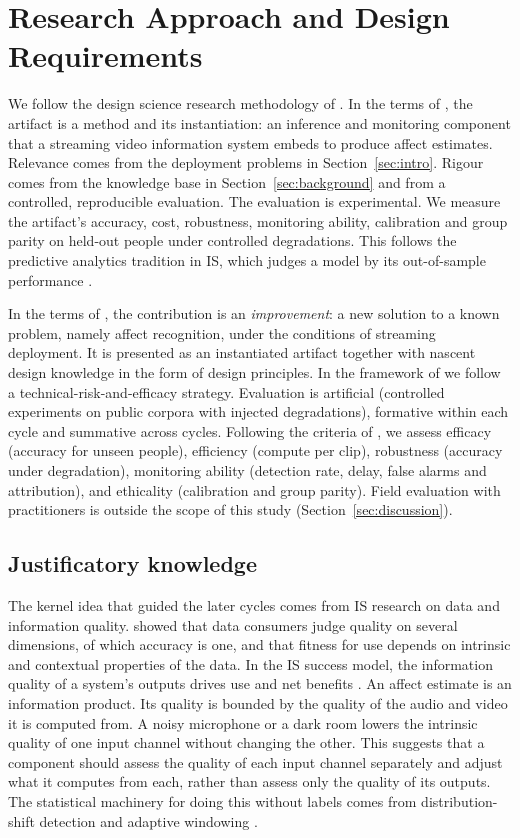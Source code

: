 \section{Research Approach and Design Requirements}\label{sec:approach}

We follow the design science research methodology of \citet{peffers2007}. In the terms of \citet{hevner2004}, the artifact is a method and its instantiation: an inference and monitoring component that a streaming video information system embeds to produce affect estimates. Relevance comes from the deployment problems in Section~\ref{sec:intro}. Rigour comes from the knowledge base in Section~\ref{sec:background} and from a controlled, reproducible evaluation. The evaluation is experimental. We measure the artifact's accuracy, cost, robustness, monitoring ability, calibration and group parity on held-out people under controlled degradations. This follows the predictive analytics tradition in IS, which judges a model by its out-of-sample performance \citep{shmueli2011}.

In the terms of \citet{gregor2013}, the contribution is an \emph{improvement}: a new solution to a known problem, namely affect recognition, under the conditions of streaming deployment. It is presented as an instantiated artifact together with nascent design knowledge in the form of design principles. In the framework of \citet{venable2016} we follow a technical-risk-and-efficacy strategy. Evaluation is artificial (controlled experiments on public corpora with injected degradations), formative within each cycle and summative across cycles. Following the criteria of \citet{prat2015}, we assess efficacy (accuracy for unseen people), efficiency (compute per clip), robustness (accuracy under degradation), monitoring ability (detection rate, delay, false alarms and attribution), and ethicality (calibration and group parity). Field evaluation with practitioners is outside the scope of this study (Section~\ref{sec:discussion}).

\subsection{Justificatory knowledge}

The kernel idea that guided the later cycles comes from IS research on data and information quality. \citet{wang1996} showed that data consumers judge quality on several dimensions, of which accuracy is one, and that fitness for use depends on intrinsic and contextual properties of the data. In the IS success model, the information quality of a system's outputs drives use and net benefits \citep{delone2003}. An affect estimate is an information product. Its quality is bounded by the quality of the audio and video it is computed from. A noisy microphone or a dark room lowers the intrinsic quality of one input channel without changing the other. This suggests that a component should assess the quality of each input channel separately and adjust what it computes from each, rather than assess only the quality of its outputs. The statistical machinery for doing this without labels comes from distribution-shift detection \citep{rabanser2019,lee2018} and adaptive windowing \citep{bifet2007}.

